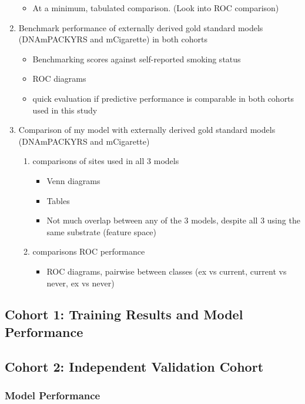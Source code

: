 \documentclass{article}
\begin{document}
\begin{enumerate}
\begin{itemize}
        \item At a minimum, tabulated comparison. (Look into ROC comparison)
    \end{itemize}
    \item Benchmark performance of externally derived gold standard models (DNAmPACKYRS and mCigarette) in both cohorts
    \begin{itemize}
        \item Benchmarking scores against self-reported smoking status
        \item ROC diagrams
        \item quick evaluation if predictive performance is comparable in both cohorts used in this study
    \end{itemize} 
    \item Comparison of my model with externally derived gold standard models (DNAmPACKYRS and mCigarette)
    \begin{enumerate}
        \item comparisons of sites used in all 3 models
        \begin{itemize}
            \item Venn diagrams
            \item Tables
            \item Not much overlap between any of the 3 models, despite all 3 using the same substrate (feature space)
        \end{itemize}
        \item comparisons ROC performance
        \begin{itemize}
            \item ROC diagrams, pairwise between classes (ex vs current, current vs never, ex vs never)
        \end{itemize}
    \end{enumerate}
\end{enumerate}

\subsection{Cohort 1: Training Results and Model Performance} \label{sec:cohort1-performance}

\subsection{Cohort 2: Independent Validation Cohort} \label{sec:val-cohort}

\subsubsection{Model Performance} \label{sec:cohort2-performance}
\end{document}
